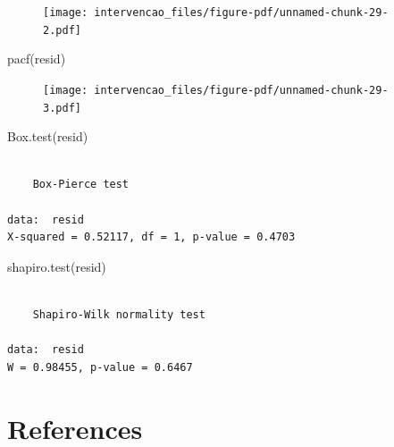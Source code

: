 \documentclass[
  letterpaper,
  DIV=11,
  numbers=noendperiod]{scrartcl}
\newenvironment{Shaded}{\begin{snugshade}}{\end{snugshade}}
\newcommand{\FunctionTok}[1]{\textcolor[rgb]{0.28,0.35,0.67}{#1}}
\newcommand{\NormalTok}[1]{\textcolor[rgb]{0.00,0.23,0.31}{#1}}
\newlength{\cslhangindent}
\newlength{\cslentryspacingunit} %
\newenvironment{CSLReferences}[2] %
 {%
  \setlength{\parindent}{0pt}
  \ifodd #1
  \let\oldpar\par
  \def\par{\hangindent=\cslhangindent\oldpar}
  \fi
  \setlength{\parskip}{#2\cslentryspacingunit}
 }%
 {}
\theoremstyle{plain}
\theoremstyle{plain}
\theoremstyle{definition}
\theoremstyle{definition}
\theoremstyle{remark}
\begin{document}
\begin{figure}[H]

{\centering \texttt{[image: intervencao\_files/figure-pdf/unnamed-chunk-29-2.pdf]}

}

\end{figure}

\begin{Shaded}
\begin{Highlighting}[]
\FunctionTok{pacf}\NormalTok{(resid)}
\end{Highlighting}
\end{Shaded}

\begin{figure}[H]

{\centering \texttt{[image: intervencao\_files/figure-pdf/unnamed-chunk-29-3.pdf]}

}

\end{figure}

\begin{Shaded}
\begin{Highlighting}[]
\FunctionTok{Box.test}\NormalTok{(resid)}
\end{Highlighting}
\end{Shaded}

\begin{verbatim}

    Box-Pierce test

data:  resid
X-squared = 0.52117, df = 1, p-value = 0.4703
\end{verbatim}

\begin{Shaded}
\begin{Highlighting}[]
\FunctionTok{shapiro.test}\NormalTok{(resid)}
\end{Highlighting}
\end{Shaded}

\begin{verbatim}

    Shapiro-Wilk normality test

data:  resid
W = 0.98455, p-value = 0.6467
\end{verbatim}


\hypertarget{references}{%
\chapter*{References}\label{references}}


\hypertarget{refs}{}
\begin{CSLReferences}{0}{0}
\end{CSLReferences}
\end{document}
